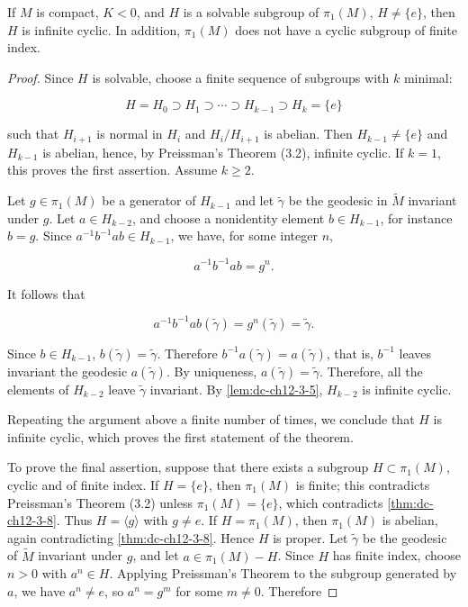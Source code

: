 \begin{theorem}[Byers]
  \label{thm:dc-ch12-3-10}
  If $M$ is compact, $K<0$, and $H$ is a solvable subgroup of $\pi_1(M)$,
  $H\neq\{e\}$, then $H$ is infinite cyclic. In addition, $\pi_1(M)$ does not have a
  cyclic subgroup of finite index.
\end{theorem}
\begin{proof}
  Since $H$ is solvable, choose a finite sequence of subgroups with $k$
  minimal:
  
  $$
  H=H_0\supset H_1\supset\cdots\supset H_{k-1}\supset H_k=\{e\}
  $$
  
  such that $H_{i+1}$ is normal in $H_i$ and $H_i/H_{i+1}$ is abelian. Then
  $H_{k-1}\neq\{e\}$ and $H_{k-1}$ is abelian, hence, by Preissman's Theorem (3.2),
  infinite cyclic. If $k=1$, this proves the first assertion. Assume $k\geq2$.
  
  Let $g\in\pi_1(M)$ be a generator of $H_{k-1}$ and let $\tilde{\gamma}$ be the
  geodesic in $\tilde{M}$ invariant under $g$. Let $a\in H_{k-2}$, and choose a
  nonidentity element $b\in H_{k-1}$, for instance $b=g$.
  Since $a^{-1}b^{-1}ab\in H_{k-1}$, we have, for some integer $n$,
  
  $$
  a^{-1}b^{-1}ab=g^n.
  $$
  
  It follows that
  
  $$
  a^{-1}b^{-1}ab(\tilde{\gamma})=g^n(\tilde{\gamma})=\tilde{\gamma}.
  $$
  
  Since $b\in H_{k-1}$, $b(\tilde{\gamma})=\tilde{\gamma}$. Therefore
  $b^{-1}a(\tilde{\gamma})=a(\tilde{\gamma})$, that is, $b^{-1}$ leaves invariant the
  geodesic $a(\tilde{\gamma})$. By uniqueness, $a(\tilde{\gamma})=\tilde{\gamma}$.
  Therefore, all the elements of $H_{k-2}$ leave $\tilde{\gamma}$ invariant. By
  \cref{lem:dc-ch12-3-5}, $H_{k-2}$ is infinite cyclic.
  
  Repeating the argument above a finite number of times, we conclude that $H$ is
  infinite cyclic, which proves the first statement of the theorem.
  
  To prove the final assertion, suppose that there exists a subgroup
  $H\subset\pi_1(M)$, cyclic and of finite index. If $H=\{e\}$, then $\pi_1(M)$ is
  finite; this contradicts Preissman's Theorem (3.2) unless $\pi_1(M)=\{e\}$, which
  contradicts \cref{thm:dc-ch12-3-8}. Thus $H=\langle g\rangle$ with $g\neq e$. If
  $H=\pi_1(M)$, then $\pi_1(M)$ is abelian, again contradicting \cref{thm:dc-ch12-3-8}. Hence
  $H$ is proper. Let $\tilde{\gamma}$ be the geodesic of $\tilde{M}$ invariant under
  $g$, and let $a\in\pi_1(M)-H$. Since $H$ has finite index, choose $n>0$ with
  $a^n\in H$. Applying Preissman's Theorem to the subgroup generated by $a$, we have
  $a^n\neq e$, so $a^n=g^m$ for some $m\neq0$. Therefore
  

\end{proof}
